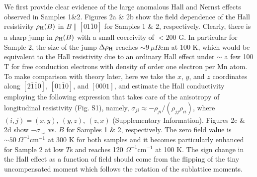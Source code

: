 \documentclass[amsmath,amssymb]{nature}
\begin{document}
We first provide clear evidence of the large anomalous Hall and Nernst effects observed in Samples 1\&2. Figures 2a \& 2b show the field dependence of the Hall resistivity $\rho_{\rm H}(B)$ in $B \parallel [01\bar{1}0]$ for Samples 1 \& 2, respectively. Clearly, there is a sharp jump in $\rho_{\rm H}(B)$ with a small coercivity of $< 200$ G. 
In particular for Sample 2, the size of the jump $\Delta\rho_{\rm H}$  reaches $\sim 9~\mu\Omega\mathrm{cm}$  at 100 K, which would be equivalent to the Hall resistivity due to an ordinary Hall effect under $\sim$ a few 100 T for free conduction electrons with density of order one electron per Mn atom. To make comparison with theory later, here we take the $x$, $y$, and $z$ coordinates along $[2\bar{1}\bar{1}0]$, $[01\bar{1}0]$, and $[0001]$, and estimate the Hall conductivity employing the following expression that takes care of the anisotropy of longitudinal resistivity (Fig. S1), namely, $\sigma_{ji} \approx -\rho_{ji}/(\rho_{jj}\rho_{ii})$, where $(i,j)=(x,y),\  (y,z),\ (z,x)$ \cite{Kiyohara2016} (Supplementary Information). Figures 2c \& 2d show $-\sigma_{zx}$ vs. $B$ for Samples 1 \& 2, respectively. The zero field value is $\sim 50~\Omega^{-1}\mathrm{cm}^{-1}$ at 300 K for both samples and it becomes particularly enhanced for Sample 2 at low $T$s and reaches 120  $\Omega^{-1}\mathrm{cm}^{-1}$ at 100 K. 
The sign change in the Hall effect as a function of field should come from the flipping of the tiny uncompensated moment which follows the rotation of the sublattice moments\cite{Mn3Sn,Nagamiya1982,TomiyoshiYamaguchi1982}. %
\end{document}
